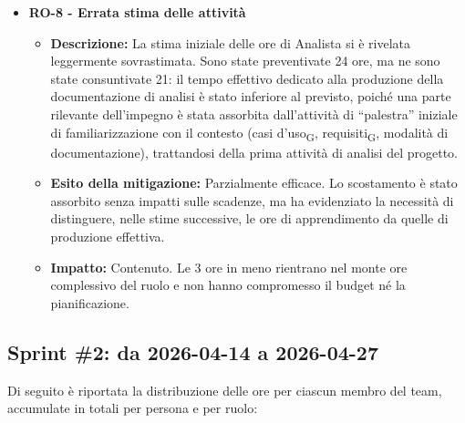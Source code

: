 \documentclass[a4paper, 10pt, colorlinks=true, linkcolor=black, urlcolor=blue, citecolor=blue, hidelinks]{article}
\begin{document}
\begin{itemize}
\begin{itemize}
\begin{itemize}
            \item \textbf{Impatto:} Inefficienze organizzative che non hanno compromesso le scadenze dello sprint\textsubscript{G}. In particolare, è stato necessario dedicare tempo alla comprensione degli strumenti e al loro utilizzo corretto, riducendo parzialmente le ore di produzione effettiva.
        \end{itemize}
        \item \textbf{RO-8 - Errata stima delle attività}
        \begin{itemize}
            \item \textbf{Descrizione:} La stima iniziale delle ore di Analista si è
            rivelata leggermente sovrastimata. Sono state preventivate 24 ore, ma ne
            sono state consuntivate 21: il tempo effettivo dedicato alla produzione
            della documentazione di analisi è stato inferiore al previsto, poiché una
            parte rilevante dell'impegno è stata assorbita dall'attività di ``palestra''
            iniziale di familiarizzazione con il contesto (casi d'uso\textsubscript{G},
            requisiti\textsubscript{G}, modalità di documentazione), trattandosi della
            prima attività di analisi del progetto.
            \item \textbf{Esito della mitigazione:} Parzialmente efficace. Lo
            scostamento è stato assorbito senza impatti sulle scadenze, ma ha
            evidenziato la necessità di distinguere, nelle stime successive, le ore di
            apprendimento da quelle di produzione effettiva.
            \item \textbf{Impatto:} Contenuto. Le 3 ore in meno rientrano nel
            monte ore complessivo del ruolo e non hanno compromesso il budget né la
            pianificazione.
        \end{itemize}
    \end{itemize}
\end{itemize}

\subsection{Sprint \#2: da 2026-04-14 a 2026-04-27}
Di seguito è riportata la distribuzione delle ore per ciascun membro del team, accumulate in totali per persona e per ruolo:
\end{document}
